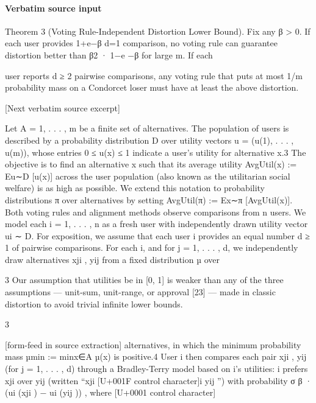 \documentclass[10pt]{article}
\begin{document}
\paragraph{Verbatim source input}
\begin{ReviewVerbatim}
Theorem 3 (Voting Rule-Independent Distortion Lower Bound). Fix any β > 0. If each user provides
                                                                           1+e−β
d=1 comparison, no voting rule can guarantee distortion better than β2 · 1−e   −β for large m. If each

user reports d ≥ 2 pairwise comparisons, any voting rule that puts at most 1/m probability mass on
a Condorcet loser must have at least the above distortion.

[Next verbatim source excerpt]

Let A = {1, . . . , m} be a finite set of alternatives. The population of users is described by a
probability distribution D over utility vectors u = (u(1), . . . , u(m)), whose entries 0 ≤ u(x) ≤ 1
indicate a user’s utility for alternative x.3 The objective is to find an alternative x such that its average
utility AvgUtil(x) := Eu∼D [u(x)] across the user population (also known as the utilitarian social
welfare) is as high as possible. We extend this notation to probability distributions π over alternatives
by setting AvgUtil(π) := Ex∼π [AvgUtil(x)].
Both voting rules and alignment methods observe comparisons from n users. We model each
i = 1, . . . , n as a fresh user with independently drawn utility vector ui ∼ D. For exposition, we
assume that each user i provides an equal number d ≥ 1 of pairwise comparisons. For each i,
and for j = 1, . . . , d, we independently draw alternatives xji , yij from a fixed distribution µ over

    3
     Our assumption that utilities be in [0, 1] is weaker than any of the three assumptions — unit-sum, unit-range,
or approval [23] — made in classic distortion to avoid trivial infinite lower bounds.


                                                           3

[form-feed in source extraction]
alternatives, in which the minimum probability mass µmin := minx∈A µ(x) is positive.4 User i
then compares each pair {xji , yij } (for j = 1, . . . , d) through a Bradley-Terry model based on i’s
utilities: i prefers xji over yij (written “xji [U+001F control character]i yij ”) with probability σ β · (ui (xji ) − ui (yij )) , where
                                                                                                        [U+0001 control character]


\end{ReviewVerbatim}
\end{document}
